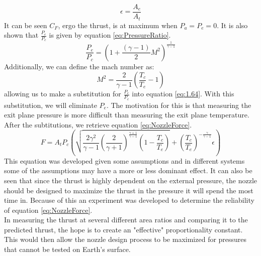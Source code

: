 \begin{equation}\label{eq:ExpansionRatio}
\epsilon=\frac{A_e}{A_t}
\end{equation}%
It can be seen $C_F$, ergo the thrust, is at maximum when $P_a=P_e=0$. It is also shown that $\frac{P_e}{P_c}$ is given by equation \ref{eq:PressureRatio}.
\begin{equation}\label{eq:PressureRatio}
\frac{P_e}{P_c}=\left(1+\frac{(\gamma-1)}{2}M^2\right)^{\frac{1}{\gamma-1}}
\end{equation}%
%
Additionally, we can define the mach number as:
\begin{equation}\label{eq:MachNumber}
M^2=\frac{2}{\gamma-1}\left(\frac{T_c}{T_e}-1\right)
\end{equation}
allowing us to make a substitution for $\frac{P_e}{P_c}$ into equation \ref{eq:1.64}. With this substitution, we will eliminate $P_e$. The motivation for this is that measuring the exit plane pressure is more difficult than measuring the exit plane temperature. After the subtitutions, we retrieve equation \ref{eq:NozzleForce}.
\begin{equation}\label{eq:NozzleForce}
F = A_t P_c \left(\sqrt{\frac{2\gamma^2}{\gamma-1}\left(\frac{2}{\gamma+1}\right)^{\frac{\gamma+1}{\gamma-1}}\left(1-\frac{T_c}{T_e}\right)}+\left(\frac{T_c}{T_e}\right)^{-\frac{\gamma}{\gamma-1}}\epsilon\right)
\end{equation}
This equation was developed given some assumptions and in different systems some of the assumptions may have a more or less dominant effect. It can also be seen that since the thrust is highly dependent on the external pressure, the nozzle should be designed to maximize the thrust in the pressure it will spend the most time in. Because of this an experiment was developed to determine the reliability of equation \ref{eq:NozzleForce}.\\
In measuring the thrust at several different area ratios and comparing it to the predicted thrust, the hope is to create an "effective" proportionality constant. This would then allow the nozzle design process to be maximized for pressures that cannot be tested on Earth's surface.
